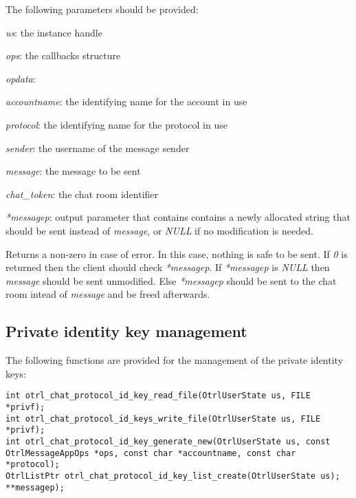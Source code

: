 The following parameters should be provided:
\begin{description}
  \item \emph{us}: the instance handle
  \item \emph{ops}: the callbacks structure
  \item \emph{opdata}: 
  \item \emph{accountname}: the identifying name for the account in use
  \item \emph{protocol}: the identifying name for the protocol in use
  \item \emph{sender}: the username of the message sender
  \item \emph{message}: the message to be sent
  \item \emph{chat\_token}: the chat room identifier
  \item \emph{*messagep}: output parameter that contains contains a newly allocated string that should be sent instead of \emph{message}, or \emph{NULL} if no modification is needed.
\end{description}
Returns a non-zero in case of error. In this case, nothing is safe to be sent. If \emph{0} is returned then the client should check \emph{*messagep}. If \emph{*messagep} is \emph{NULL} then \emph{message} should be sent unmodified. Else \emph{*messagep} should be sent to the chat room intead of \emph{message} and be freed afterwards.

\subsection{Private identity key management}
\label{section:private_key_management}
The following functions are provided for the management of the private identity keys:
\begin{lstlisting}[caption={Private identity key management functions}]
int otrl_chat_protocol_id_key_read_file(OtrlUserState us, FILE *privf);
int otrl_chat_protocol_id_keys_write_file(OtrlUserState us, FILE *privf);
int otrl_chat_protocol_id_key_generate_new(OtrlUserState us, const OtrlMessageAppOps *ops, const char *accountname, const char *protocol);
OtrlListPtr otrl_chat_protocol_id_key_list_create(OtrlUserState us);
**messagep);
\end{lstlisting}


